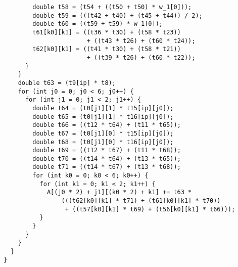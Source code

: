 \documentclass[presentation]{beamer}
\begin{document}
\begin{frame}
\begin{columns}
\begin{column}{0.5\textwidth}
\begin{verbatim}
        double t58 = (t54 + ((t50 + t50) * w_1[0]));
        double t59 = (((t42 + t40) + (t45 + t44)) / 2);
        double t60 = ((t59 + t59) * w_1[0]);
        t61[k0][k1] = ((t36 * t30) + (t58 * t23))
                       + ((t43 * t26) + (t60 * t24));
        t62[k0][k1] = ((t41 * t30) + (t58 * t21))
                       + ((t39 * t26) + (t60 * t22));
      }
    }
    double t63 = (t9[ip] * t8);
    for (int j0 = 0; j0 < 6; j0++) {
      for (int j1 = 0; j1 < 2; j1++) {
        double t64 = (t0[j1][1] * t15[ip][j0]);
        double t65 = (t0[j1][1] * t16[ip][j0]);
        double t66 = ((t12 * t64) + (t11 * t65));
        double t67 = (t0[j1][0] * t15[ip][j0]);
        double t68 = (t0[j1][0] * t16[ip][j0]);
        double t69 = ((t12 * t67) + (t11 * t68));
        double t70 = ((t14 * t64) + (t13 * t65));
        double t71 = ((t14 * t67) + (t13 * t68));
        for (int k0 = 0; k0 < 6; k0++) {
          for (int k1 = 0; k1 < 2; k1++) {
            A[(j0 * 2) + j1][(k0 * 2) + k1] += t63 *
                (((t62[k0][k1] * t71) + (t61[k0][k1] * t70))
                 + ((t57[k0][k1] * t69) + (t56[k0][k1] * t66)));
          }
        }
      }
    }
  }
}
\end{verbatim}
    \end{column}
  \end{columns}
\end{frame}
\egroup
\end{document}
